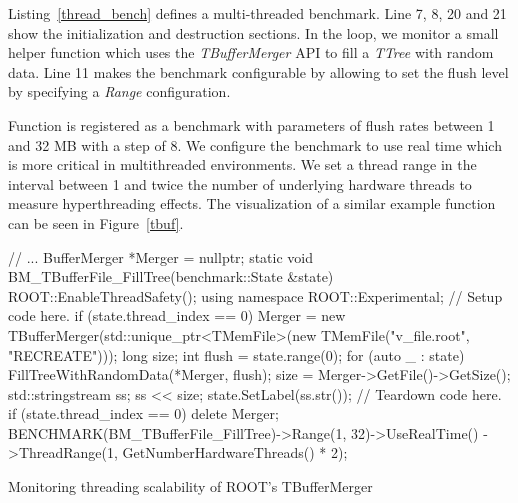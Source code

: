 \documentclass{webofc}
\begin{document}
Listing~\ref{thread_bench} defines a multi-threaded benchmark. Line 7, 8, 20 and 21 show the initialization and destruction sections. In the loop, we monitor a small helper function which uses the \textit{TBufferMerger} API to fill a \textit{TTree} with random data. Line 11 makes the benchmark configurable by allowing to set the flush level by specifying a \textit{Range} configuration.

Function is registered as a benchmark with parameters of flush rates between 1 and 32 MB with a step of 8. We configure the benchmark to use real time which is more critical in multithreaded environments. We set a thread range in the interval between 1 and twice the number of underlying hardware threads to measure hyperthreading effects. The visualization of a similar  example function can be seen in Figure~\ref{tbuf}.

\begin{listing}[h]
   \noindent
   \begin{minipage}[h]{.7\textwidth}
   \begin{cppcode*}{}
   // ...
   BufferMerger *Merger = nullptr;
   static void BM_TBufferFile_FillTree(benchmark::State &state) {
      ROOT::EnableThreadSafety();
      using namespace ROOT::Experimental;
      // Setup code here.
      if (state.thread_index == 0)
         Merger = new TBufferMerger(std::unique_ptr<TMemFile>(new TMemFile("v_file.root",
                                                                           "RECREATE")));
      long size;
      int flush = state.range(0);
      for (auto _ : state) {
         FillTreeWithRandomData(*Merger, flush);
         size = Merger->GetFile()->GetSize();
      }
      std::stringstream ss;
      ss << size;
      state.SetLabel(ss.str());
      // Teardown code here.
      if (state.thread_index == 0)
         delete Merger;
   }
   BENCHMARK(BM_TBufferFile_FillTree)->Range(1, 32)->UseRealTime()
                                     ->ThreadRange(1, GetNumberHardwareThreads() * 2);
   \end{cppcode*}
   \end{minipage}
   \caption{Monitoring threading scalability of ROOT's TBufferMerger}
   \label{thread_bench}
\end{listing}


\end{document}
